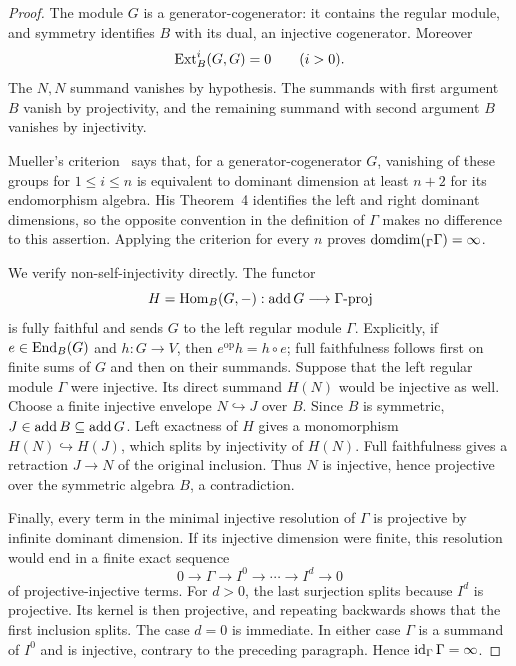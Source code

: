 \begin{proof}
The module $G$ is a generator-cogenerator: it contains the regular
module, and symmetry identifies $B$ with its dual, an injective
cogenerator. Moreover
\[
 \operatorname{Ext}_B^i(G,G)=0\qquad(i>0).
\]
The $N,N$ summand vanishes by hypothesis. The summands with first
argument $B$ vanish by projectivity, and the remaining summand with
second argument $B$ vanishes by injectivity.

Mueller's criterion~\cite[Lemma~3]{Mueller1968} says that, for a
generator-cogenerator $G$, vanishing of these groups for
$1\leq i\leq n$ is equivalent to dominant dimension at least $n+2$
for its endomorphism algebra. His Theorem~4 identifies the left and
right dominant dimensions, so the opposite convention in the
definition of $\Gamma$ makes no difference to this assertion.
Applying the criterion for every $n$ proves
$\operatorname{domdim}({}_\Gamma\Gamma)=\infty$.

We verify non-self-injectivity directly. The functor
\[
 H=\operatorname{Hom}_B(G,-):\operatorname{add} G\longrightarrow \Gamma\text{-}\mathrm{proj}
\]
is fully faithful and sends $G$ to the left regular module $\Gamma$.
Explicitly, if $e\in\operatorname{End}_B(G)$ and $h:G\to V$, then
$e^{\mathrm{op}}h=h\circ e$; full faithfulness follows first on
finite sums of $G$ and then on their summands.
Suppose that the left regular module $\Gamma$ were injective. Its direct
summand $H(N)$ would be injective as well. Choose a finite injective envelope
$N\hookrightarrow J$ over $B$. Since $B$ is symmetric,
$J\in\operatorname{add} B\subseteq\operatorname{add} G$. Left exactness of $H$ gives a
monomorphism $H(N)\hookrightarrow H(J)$, which splits by injectivity
of $H(N)$. Full faithfulness gives a retraction $J\to N$ of the
original inclusion. Thus $N$ is injective, hence projective over the
symmetric algebra $B$, a contradiction.

Finally, every term in the minimal injective resolution of $\Gamma$
is projective by infinite dominant dimension. If its injective
dimension were finite, this resolution would end in a finite exact
sequence
\[
 0\longrightarrow\Gamma\longrightarrow I^0\longrightarrow\cdots
 \longrightarrow I^d\longrightarrow0
\]
of projective-injective terms. For $d>0$, the last surjection splits
because $I^d$ is projective. Its kernel is then projective, and
repeating backwards shows that the first inclusion splits. The case
$d=0$ is immediate. In either case $\Gamma$ is a summand of $I^0$
and is injective, contrary to the preceding paragraph. Hence
$\operatorname{id}_\Gamma\Gamma=\infty$.
\end{proof}

